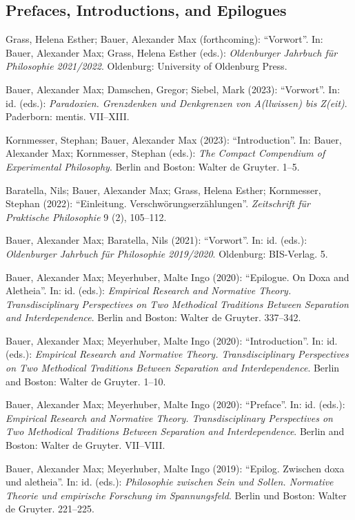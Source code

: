 \documentclass[a4paper,10pt]{article}
\newenvironment{literature}{%
   \parskip6pt\parindent0pt\raggedright
   \def\lititem{\hangindent=1cm\hangafter1}}{%
   \par\ignorespaces}
\begin{document}
\subsection*{Prefaces, Introductions, and Epilogues}
\begin{literature}
\lititem Grass, Helena Esther; Bauer, Alexander Max (forthcoming): \enquote{Vorwort}. In: Bauer, Alexander Max; Grass, Helena Esther (eds.): \textit{Oldenburger Jahrbuch für Philosophie 2021/2022}. Oldenburg: University of Oldenburg Press.

\lititem Bauer, Alexander Max; Damschen, Gregor; Siebel, Mark (2023): \enquote{Vorwort}. In: id. (eds.): \textit{Paradoxien. Grenzdenken und Denkgrenzen von A(llwissen) bis Z(eit)}. Paderborn: mentis. VII--XIII.

\lititem Kornmesser, Stephan; Bauer, Alexander Max (2023): \enquote{Introduction}. In: Bauer, Alexander Max; Kornmesser, Stephan (eds.): \textit{The Compact Compendium of Experimental Philosophy}. Berlin and Boston: Walter de Gruyter. 1--5.

\lititem Baratella, Nils; Bauer, Alexander Max; Grass, Helena Esther; Kornmesser, Stephan (2022): \enquote{Einleitung. Verschwörungserzählungen}. \textit{Zeitschrift für Praktische Philosophie} 9 (2), 105--112.

\lititem Bauer, Alexander Max; Baratella, Nils (2021): \enquote{Vorwort}. In: id. (eds.): \textit{Oldenburger Jahrbuch für Philosophie 2019/2020}. Oldenburg: BIS-Verlag. 5.

\lititem Bauer, Alexander Max; Meyerhuber, Malte Ingo (2020): \enquote{Epilogue. On Doxa and Aletheia}. In: id. (eds.): \textit{Empirical Research and Normative Theory. Transdisciplinary Perspectives on Two Methodical Traditions Between Separation and Interdependence}. Berlin and Boston: Walter de Gruyter. 337--342.

\lititem Bauer, Alexander Max; Meyerhuber, Malte Ingo (2020): \enquote{Introduction}. In: id. (eds.): \textit{Empirical Research and Normative Theory. Transdisciplinary Perspectives on Two Methodical Traditions Between Separation and Interdependence}. Berlin and Boston: Walter de Gruyter. 1--10.

\lititem Bauer, Alexander Max; Meyerhuber, Malte Ingo (2020): \enquote{Preface}. In: id. (eds.): \textit{Empirical Research and Normative Theory. Transdisciplinary Perspectives on Two Methodical Traditions Between Separation and Interdependence}. Berlin and Boston: Walter de Gruyter. VII--VIII.

\lititem Bauer, Alexander Max; Meyerhuber, Malte Ingo (2019): \enquote{Epilog. Zwischen doxa und aletheia}. In: id. (eds.): \textit{Philosophie zwischen Sein und Sollen. Normative Theorie und empirische Forschung im Spannungsfeld}. Berlin und Boston: Walter de Gruyter. 221--225.


\end{literature}
\end{document}
